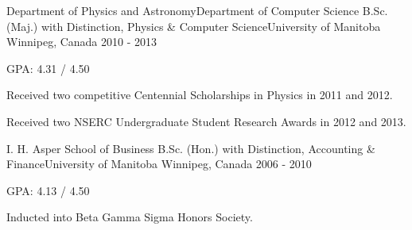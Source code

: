 \begin{cventries}
  \cventry
    {Department of Physics and Astronomy{\enskip\cdotp\enskip}Department of Computer Science} %
    {B.Sc. (Maj.) with Distinction, Physics \& Computer Science{\enskip\cdotp\enskip}University of Manitoba} %
    {Winnipeg, Canada} %
    {2010 - 2013} %
    {
      \begin{cvitems} %
        \item {GPA: 4.31 / 4.50}
        \item {Received two competitive Centennial Scholarships in Physics in 2011 and 2012.}
        \item {Received two NSERC Undergraduate Student Research Awards in 2012 and 2013.}
      \end{cvitems}
    }

  \cventry
    {I. H. Asper School of Business} %
    {B.Sc. (Hon.) with Distinction, Accounting \& Finance{\enskip\cdotp\enskip}University of Manitoba} %
    {Winnipeg, Canada} %
    {2006 - 2010} %
    {
      \begin{cvitems} %
        \item {GPA: 4.13 / 4.50}
        \item {Inducted into Beta Gamma Sigma Honors Society.}
      \end{cvitems}
    }

\end{cventries}
